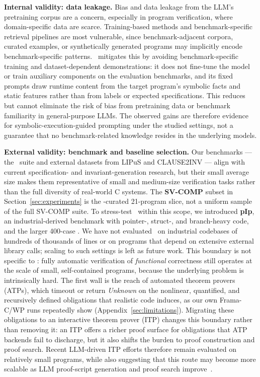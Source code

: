 \smallskip
\noindent\textbf{Internal validity: data leakage.}
Bias and data leakage from the LLM's pretraining corpus are a concern,
especially in program verification, where domain-specific data are scarce.
Training-based methods and benchmark-specific retrieval pipelines are most
vulnerable, since benchmark-adjacent corpora, curated examples, or synthetically
generated programs may implicitly encode benchmark-specific patterns.
\toolname\ mitigates this by avoiding benchmark-specific training and
dataset-dependent demonstrations: it does not fine-tune the model or train
auxiliary components on the evaluation benchmarks, and its fixed prompts draw
runtime content from the target program's symbolic facts and static features
rather than from labels or expected specifications. This reduces but cannot
eliminate the risk of bias from pretraining data or benchmark familiarity in
general-purpose LLMs. The observed gains are therefore evidence for
symbolic-execution-guided prompting under the studied settings, not a guarantee
that no benchmark-related knowledge resides in the underlying models.

\smallskip
\noindent\textbf{External validity: benchmark and baseline selection.}
Our benchmarks --- the \autospec\ suite and external datasets from LIPuS and
CLAUSE2INV --- align with current specification- and invariant-generation
research, but their small average size makes them representative of small and
medium-size verification tasks rather than the full diversity of real-world C
systems. The \textbf{SV-COMP} subset in Section~\ref{sec:experiments} is the
\autospec-curated 21-program slice, not a uniform sample of the full SV-COMP
suite. To stress-test \toolname\ within this scope, we introduced \textbf{pIp},
an industrial-derived benchmark with pointer-, struct-, and branch-heavy code,
and the larger 400-case \textbf{}. We have not evaluated \toolname\ on
industrial codebases of hundreds of thousands of lines or on programs that
depend on extensive external library calls; scaling to such settings is left as
future work. This boundary is not specific to \toolname: fully automatic
verification of \emph{functional} correctness still operates at the scale of
small, self-contained programs, because the underlying problem is intrinsically
hard. The first wall is the reach of automated theorem provers (ATPs), which
timeout or return \emph{Unknown} on the nonlinear, quantified, and recursively
defined obligations that realistic code induces, as our own Frama-C/WP runs
repeatedly show (Appendix~\ref{sec:limitations}). Migrating these obligations to
an interactive theorem prover (ITP) changes this boundary rather than removing
it: an ITP offers a richer proof surface for obligations that ATP backends fail
to discharge, but it also shifts the burden to proof construction and proof
search. Recent LLM-driven ITP efforts therefore remain evaluated on relatively
small programs, while also suggesting that this route may become more scalable
as LLM proof-script generation and proof search improve~\cite{yang2026how,thakur2025clever,ye2026verina,li2026goedelcodeproverhierarchicalproofsearch}.

